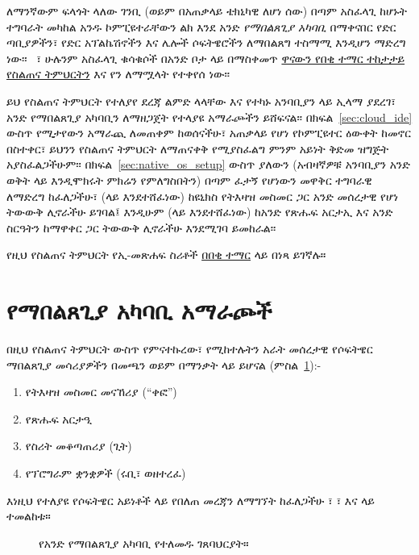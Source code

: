 
\noindent ለማንኛውም ፍላጎት ላለው ገንቢ (ወይም በአጠቃላይ ቴክኒካዊ ለሆነ ሰው) በጣም አስፈላጊ ከሆኑት ተግባራት መካከል አንዱ ኮምፒዩተራቸውን ልክ እንደ አንድ \emph{የማበልጸጊያ አካባቢ} በማቀናበር የድር ጣቢያዎችን፣ የድር አፕልኬሽኖችን እና ሌሎች ሶፍትዌሮችን ለማበልጸግ ተስማሚ እንዲሆን ማድረግ ነው፡፡ \ledev\ ፣ ሁሉንም አስፈላጊ ቁሳቁሶች በአንድ ቦታ ላይ በማስቀመጥ \href{http://www.learnenough.com/tutorials}{ዋናውን የበቂ ተማር ተከታታይ የስልጠና ትምህርትን} እና የ\rort\/ን ለማሟላት የተቀየሰ ነው፡፡

ይህ የስልጠና ትምህርት የተለያየ ደረጃ ልምድ ላላቸው እና የተካኑ አንባቢያን ላይ ኢላማ ያደረገ፣ አንድ የማበልጸጊያ አካባቢን ለማዘጋጀት የተላያዩ አማራጮችን ይሸፍናል፡፡ በክፍል~\ref{sec:cloud_ide} ውስጥ የሚታየውን አማራጪ ለመጠቀም ከወሰናችሁ፣ አጠቃላይ የሆነ የኮምፒዩተር ዕውቀት ከመኖር በስተቀር፣ ይህንን የስልጠና ትምህርት ለማጠናቀቅ የሚያስፈልግ ምንም አይነት ቅድመ ዝግጅት አያስፈልጋችሁም፡፡ በክፍል~\ref{sec:native_os_setup} ውስጥ ያለውን (አብዛኛዎቹ አንባቢያን አንድ ወቅት ላይ እንዲሞክሩት ምክሬን የምለግስበትን) በጣም ፈታኝ የሆነውን መዋቅር ተግባራዊ ለማድረግ ከፈለጋችሁ፣ (\lecl ላይ እንደተሸፈነው) ከዩኒክስ የትእዛዝ መስመር ጋር አንድ መሰረታዊ የሆነ ትውውቅ ሊኖራችሁ ይገባል፤ እንዲሁም ( ላይ እንደተሸፈነው) ከአንድ የጽሑፍ አርታኢ እና አንድ ስርዓትን ከማዋቀር ጋር ትውውቅ ሊኖራችሁ እንደሚገባ ይመከራል፡፡

የዚህ የስልጠና ትምህርት የኢ-መጽሐፍ ስሪቶች \href{https://www.softcover.io/email-capture/28fdb94f/learn_enough_dev_environment}{በበቂ ተማር} ላይ በነጻ ይገኛሉ።

\section{የማበልጸጊያ አካባቢ አማራጮች} %
\label{sec:dev_environment_options}

በዚህ የስልጠና ትምህርት ውስጥ የምናተኩረው፣ የሚከተሉትን አራት መሰረታዊ የሶፍትዌር ማበልጸጊያ መሳሪያዎችን በመጫን ወይም በማንቃት ላይ ይሆናል (ምስል~\ref{fig:dev_environment}):-

\begin{enumerate}
  \item የትእዛዝ መስመር መናኸሪያ (``ቀፎ'')
  \item የጽሑፍ አርታዒ
  \item የስሪት መቆጣጠሪያ (ጊት)
  \item የፕሮግራም ቋንቋዎች (ሩቢ፣ ወዘተረፈ)
\end{enumerate}

እነዚህ የተለያዩ የሶፍትዌር አይነቶች ላይ የበለጠ መረጃን ለማግኘት ከፈለጋችሁ \lecl\/፣ \/፣ \leg እና \ler ላይ ተመልከቱ።

\begin{figure}
\begin{center}
\end{center}
\caption{የአንድ የማበልጸጊያ አካባቢ የተለመዱ ገጸባህርያት።\label{fig:dev_environment}}
\end{figure}

